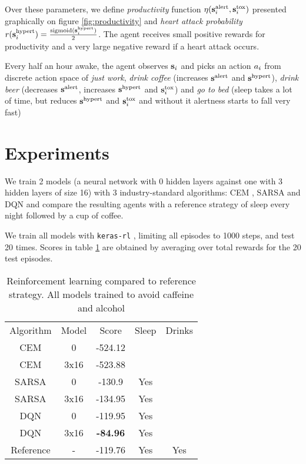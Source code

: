 Over these parameters, we define \emph{productivity} function $\eta(\textbf{s}^\text{alert}_i, \textbf{s}^\text{tox}_i)$ presented graphically on figure \ref{fig:productivity} and \emph{heart attack probability} $r(\textbf{s}^\text{hypert}_i)=\frac{\text{sigmoid}(\textbf{s}^\text{hypert}_i)}{2}$.
The agent receives small positive rewards for productivity and a very large negative reward if a heart attack occurs.

Every half an hour awake, the agent observes $\textbf{s}_i$ and picks an action $a_i$ from discrete action space of \emph{just work}, \emph{drink coffee} (increases $\textbf{s}^\text{alert}$ and $\textbf{s}^\text{hypert}$), \emph{drink beer} (decreases $\textbf{s}^\text{alert}$, increases $\textbf{s}^\text{hypert}$ and $\textbf{s}^\text{tox}_i$) and \emph{go to bed} (sleep takes a lot of time, but reduces $\textbf{s}^\text{hypert}$ and $\textbf{s}^\text{tox}_i$ and without it alertness starts to fall very fast)

\section{Experiments}
\label{sec:heartpole-experiments}


We train 2 models (a neural network with 0 hidden layers against one with 3 hidden layers of size 16) with 3 industry-standard algorithms: CEM \cite{cem}, SARSA \cite[Chapter 6]{thebook} and DQN \cite{dqn1,dqn2} and compare the resulting agents with a reference strategy of sleep every night followed by a cup of coffee.

We train all models with \texttt{keras-rl} \cite{kerasrl}, limiting all episodes to 1000 steps, and test 20 times.
Scores in table \ref{tab:heartpole-results} are obtained by averaging over total rewards for the 20 test episodes.

\begin{table}[]
    \centering
    \begin{tabular}{c|c|c|c|c}
         Algorithm & Model & Score & Sleep & Drinks \\
         CEM & 0 & -524.12 &  &   \\
         CEM & 3x16 & -523.88 & & \\
         SARSA & 0 & -130.9 & Yes & \\
         SARSA & 3x16 & -134.95 & Yes & \\
         DQN & 0 & -119.95 & Yes &  \\
         DQN & 3x16 & \textbf{-84.96} & Yes &  \\
         Reference & - & -119.76 & Yes & Yes 
    \end{tabular}
    \caption{Reinforcement learning compared to reference strategy. All models trained to avoid caffeine and alcohol}
    \label{tab:heartpole-results}
\end{table}

